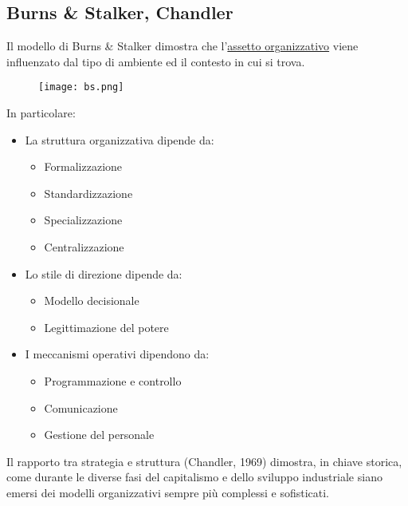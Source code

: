 \documentclass{article}
\begin{document}
\newpage

\subsection{Burns \& Stalker, Chandler}

Il modello di Burns \& Stalker dimostra che l'\hyperref[fig:assetto]{assetto organizzativo} viene influenzato dal tipo di ambiente ed il contesto in cui si trova.\newline

\begin{figure}[ht]
    \centering
    \texttt{[image: bs.png]}
\end{figure}

\noindent In particolare:
\begin{itemize}
    \item La struttura organizzativa dipende da:
        \begin{itemize}
            \item Formalizzazione
            \item Standardizzazione
            \item Specializzazione
            \item Centralizzazione
        \end{itemize}
    \item Lo stile di direzione dipende da:
        \begin{itemize}
            \item Modello decisionale
            \item Legittimazione del potere
        \end{itemize}
    \item I meccanismi operativi dipendono da:
        \begin{itemize}
            \item Programmazione e controllo
            \item Comunicazione
            \item Gestione del personale\newline
        \end{itemize}
\end{itemize}

\noindent Il rapporto tra strategia e struttura (Chandler, 1969) dimostra, in chiave storica, come durante le diverse fasi del capitalismo e dello sviluppo industriale siano emersi dei modelli organizzativi sempre più complessi e sofisticati.
\end{document}
